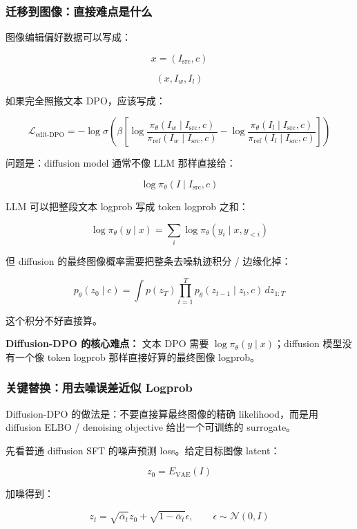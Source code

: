 \subsubsection{迁移到图像：直接难点是什么}

图像编辑偏好数据可以写成：

\[
x=(I_\text{src},c)
\]

\[
(x,I_w,I_l)
\]

如果完全照搬文本 DPO，应该写成：

\[
\mathcal{L}_\text{edit-DPO}
=
-
\log
\sigma
\left(
\beta
\left[
\log\frac{\pi_\theta(I_w\mid I_\text{src},c)}
{\pi_\text{ref}(I_w\mid I_\text{src},c)}
-
\log\frac{\pi_\theta(I_l\mid I_\text{src},c)}
{\pi_\text{ref}(I_l\mid I_\text{src},c)}
\right]
\right)
\]

问题是：diffusion model 通常不像 LLM 那样直接给：

\[
\log \pi_\theta(I\mid I_\text{src},c)
\]

LLM 可以把整段文本 logprob 写成 token logprob 之和：

\[
\log \pi_\theta(y\mid x)
=
\sum_i
\log \pi_\theta(y_i\mid x,y_{<i})
\]

但 diffusion 的最终图像概率需要把整条去噪轨迹积分 / 边缘化掉：

\[
p_\theta(z_0\mid c)
=
\int
p(z_T)
\prod_{t=1}^{T}
p_\theta(z_{t-1}\mid z_t,c)
\,
dz_{1:T}
\]

这个积分不好直接算。

\begin{warnbox}
\textbf{Diffusion-DPO 的核心难点：} 文本 DPO 需要 $\log \pi_\theta(y\mid x)$；diffusion 模型没有一个像 token logprob 那样直接好算的最终图像 logprob。
\end{warnbox}

\subsubsection{关键替换：用去噪误差近似 Logprob}

Diffusion-DPO 的做法是：不要直接算最终图像的精确 likelihood，而是用 diffusion ELBO / denoising objective 给出一个可训练的 surrogate。

先看普通 diffusion SFT 的噪声预测 loss。给定目标图像 latent：

\[
z_0
=
E_\text{VAE}(I)
\]

加噪得到：

\[
z_t
=
\sqrt{\bar{\alpha}_t}z_0
+
\sqrt{1-\bar{\alpha}_t}\epsilon,
\qquad
\epsilon\sim\mathcal{N}(0,I)
\]

